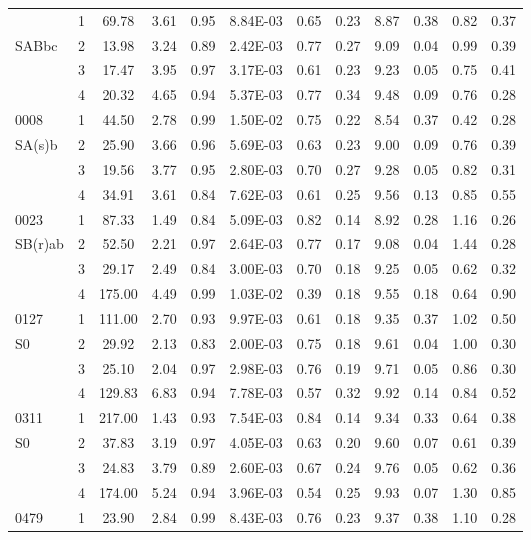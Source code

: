 \begin{center}
\begin{longtable}{lccccccccccc}
\endlastfoot
0002	&	1	&	69.78	&	3.61	&	0.95	&	8.84E-03	&	0.65	&	0.23	&	8.87	&	0.38	&	0.82	&	0.37	\\
SABbc	&	2	&	13.98	&	3.24	&	0.89	&	2.42E-03	&	0.77	&	0.27	&	9.09	&	0.04	&	0.99	&	0.39	\\
	&	3	&	17.47	&	3.95	&	0.97	&	3.17E-03	&	0.61	&	0.23	&	9.23	&	0.05	&	0.75	&	0.41	\\
	&	4	&	20.32	&	4.65	&	0.94	&	5.37E-03	&	0.77	&	0.34	&	9.48	&	0.09	&	0.76	&	0.28	\\
0008	&	1	&	44.50	&	2.78	&	0.99	&	1.50E-02	&	0.75	&	0.22	&	8.54	&	0.37	&	0.42	&	0.28	\\
SA(s)b	&	2	&	25.90	&	3.66	&	0.96	&	5.69E-03	&	0.63	&	0.23	&	9.00	&	0.09	&	0.76	&	0.39	\\
	&	3	&	19.56	&	3.77	&	0.95	&	2.80E-03	&	0.70	&	0.27	&	9.28	&	0.05	&	0.82	&	0.31	\\
	&	4	&	34.91	&	3.61	&	0.84	&	7.62E-03	&	0.61	&	0.25	&	9.56	&	0.13	&	0.85	&	0.55	\\
0023	&	1	&	87.33	&	1.49	&	0.84	&	5.09E-03	&	0.82	&	0.14	&	8.92	&	0.28	&	1.16	&	0.26	\\
SB(r)ab	&	2	&	52.50	&	2.21	&	0.97	&	2.64E-03	&	0.77	&	0.17	&	9.08	&	0.04	&	1.44	&	0.28	\\
	&	3	&	29.17	&	2.49	&	0.84	&	3.00E-03	&	0.70	&	0.18	&	9.25	&	0.05	&	0.62	&	0.32	\\
	&	4	&	175.00	&	4.49	&	0.99	&	1.03E-02	&	0.39	&	0.18	&	9.55	&	0.18	&	0.64	&	0.90	\\
0127	&	1	&	111.00	&	2.70	&	0.93	&	9.97E-03	&	0.61	&	0.18	&	9.35	&	0.37	&	1.02	&	0.50	\\
S0	&	2	&	29.92	&	2.13	&	0.83	&	2.00E-03	&	0.75	&	0.18	&	9.61	&	0.04	&	1.00	&	0.30	\\
	&	3	&	25.10	&	2.04	&	0.97	&	2.98E-03	&	0.76	&	0.19	&	9.71	&	0.05	&	0.86	&	0.30	\\
	&	4	&	129.83	&	6.83	&	0.94	&	7.78E-03	&	0.57	&	0.32	&	9.92	&	0.14	&	0.84	&	0.52	\\
0311	&	1	&	217.00	&	1.43	&	0.93	&	7.54E-03	&	0.84	&	0.14	&	9.34	&	0.33	&	0.64	&	0.38	\\
S0	&	2	&	37.83	&	3.19	&	0.97	&	4.05E-03	&	0.63	&	0.20	&	9.60	&	0.07	&	0.61	&	0.39	\\
	&	3	&	24.83	&	3.79	&	0.89	&	2.60E-03	&	0.67	&	0.24	&	9.76	&	0.05	&	0.62	&	0.36	\\
	&	4	&	174.00	&	5.24	&	0.94	&	3.96E-03	&	0.54	&	0.25	&	9.93	&	0.07	&	1.30	&	0.85	\\
0479	&	1	&	23.90	&	2.84	&	0.99	&	8.43E-03	&	0.76	&	0.23	&	9.37	&	0.38	&	1.10	&	0.28	\\

\end{longtable}
\end{center}
